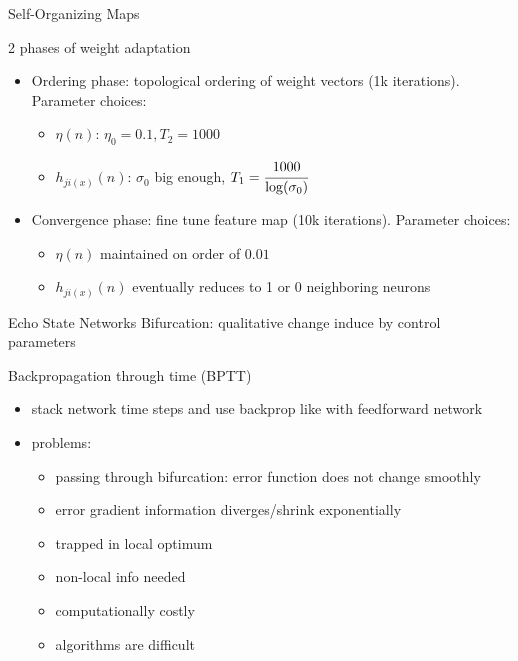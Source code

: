 \documentclass[9pt,t]{beamer}
\begin{document}
\begin{frame}{Self-Organizing Maps}
    \begin{alertblock}{2 phases of weight adaptation}
        \begin{itemize}
            \item Ordering phase: topological ordering of weight vectors (1k iterations). Parameter choices:
            \begin{itemize}
                \item $ \eta(n) $: $ \eta_0 = 0.1, T_2=1000 $
                \item $ h_{ji(x)}(n) $: $ \sigma_0$ big enough, $T_1=\cfrac{1000}{\log(\sigma_0)} $
            \end{itemize}
            \item Convergence phase: fine tune feature map (10k iterations). Parameter choices:
            \begin{itemize}
                \item $ \eta(n) $ maintained on order of $ 0.01 $
                \item $ h_{ji(x)}(n) $ eventually reduces to 1 or 0 neighboring neurons
            \end{itemize}
        \end{itemize}
    \end{alertblock}
\end{frame}

\begin{frame}{Echo State Networks}
    Bifurcation: qualitative change induce by control parameters
    \begin{alertblock}{Backpropagation through time (BPTT)}
        \begin{itemize}
            \item stack network time steps and use backprop like with feedforward network
            \item problems:
            \begin{itemize}
                \item passing through bifurcation: error function does not change smoothly
                \item error gradient information diverges/shrink exponentially
                \item trapped in local optimum
                \item non-local info needed
                \item computationally costly
                \item algorithms are difficult
            \end{itemize}
        \end{itemize}
    \end{alertblock}
\end{frame}

\end{document}

